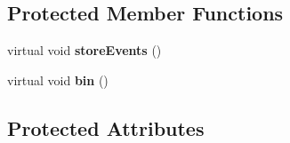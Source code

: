 \subsection*{Protected Member Functions}
\begin{DoxyCompactItemize}
\item 
\hypertarget{class_root_reader_a4c2e6179e52197a407b5a5d216c48243}{virtual void {\bfseries store\-Events} ()}\label{class_root_reader_a4c2e6179e52197a407b5a5d216c48243}

\item 
\hypertarget{class_root_reader_a1cf7942febb7897b17baffe2c16a495e}{virtual void {\bfseries bin} ()}\label{class_root_reader_a1cf7942febb7897b17baffe2c16a495e}

\end{DoxyCompactItemize}
\subsection*{Protected Attributes}
